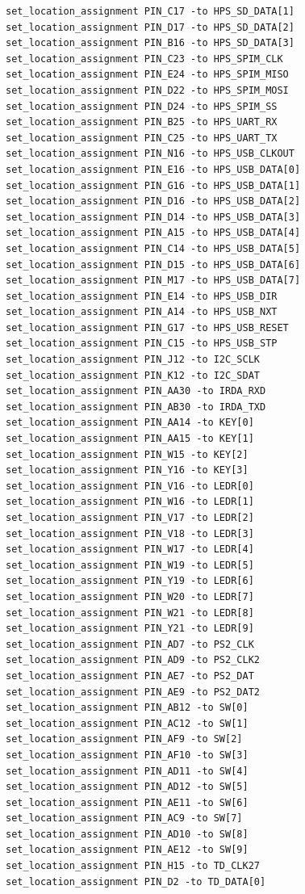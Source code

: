 \documentclass[conference]{IEEEtran}
\begin{document}
\begin{lstlisting}
set_location_assignment PIN_C17 -to HPS_SD_DATA[1]
set_location_assignment PIN_D17 -to HPS_SD_DATA[2]
set_location_assignment PIN_B16 -to HPS_SD_DATA[3]
set_location_assignment PIN_C23 -to HPS_SPIM_CLK
set_location_assignment PIN_E24 -to HPS_SPIM_MISO
set_location_assignment PIN_D22 -to HPS_SPIM_MOSI
set_location_assignment PIN_D24 -to HPS_SPIM_SS
set_location_assignment PIN_B25 -to HPS_UART_RX
set_location_assignment PIN_C25 -to HPS_UART_TX
set_location_assignment PIN_N16 -to HPS_USB_CLKOUT
set_location_assignment PIN_E16 -to HPS_USB_DATA[0]
set_location_assignment PIN_G16 -to HPS_USB_DATA[1]
set_location_assignment PIN_D16 -to HPS_USB_DATA[2]
set_location_assignment PIN_D14 -to HPS_USB_DATA[3]
set_location_assignment PIN_A15 -to HPS_USB_DATA[4]
set_location_assignment PIN_C14 -to HPS_USB_DATA[5]
set_location_assignment PIN_D15 -to HPS_USB_DATA[6]
set_location_assignment PIN_M17 -to HPS_USB_DATA[7]
set_location_assignment PIN_E14 -to HPS_USB_DIR
set_location_assignment PIN_A14 -to HPS_USB_NXT
set_location_assignment PIN_G17 -to HPS_USB_RESET
set_location_assignment PIN_C15 -to HPS_USB_STP
set_location_assignment PIN_J12 -to I2C_SCLK
set_location_assignment PIN_K12 -to I2C_SDAT
set_location_assignment PIN_AA30 -to IRDA_RXD
set_location_assignment PIN_AB30 -to IRDA_TXD
set_location_assignment PIN_AA14 -to KEY[0]
set_location_assignment PIN_AA15 -to KEY[1]
set_location_assignment PIN_W15 -to KEY[2]
set_location_assignment PIN_Y16 -to KEY[3]
set_location_assignment PIN_V16 -to LEDR[0]
set_location_assignment PIN_W16 -to LEDR[1]
set_location_assignment PIN_V17 -to LEDR[2]
set_location_assignment PIN_V18 -to LEDR[3]
set_location_assignment PIN_W17 -to LEDR[4]
set_location_assignment PIN_W19 -to LEDR[5]
set_location_assignment PIN_Y19 -to LEDR[6]
set_location_assignment PIN_W20 -to LEDR[7]
set_location_assignment PIN_W21 -to LEDR[8]
set_location_assignment PIN_Y21 -to LEDR[9]
set_location_assignment PIN_AD7 -to PS2_CLK
set_location_assignment PIN_AD9 -to PS2_CLK2
set_location_assignment PIN_AE7 -to PS2_DAT
set_location_assignment PIN_AE9 -to PS2_DAT2
set_location_assignment PIN_AB12 -to SW[0]
set_location_assignment PIN_AC12 -to SW[1]
set_location_assignment PIN_AF9 -to SW[2]
set_location_assignment PIN_AF10 -to SW[3]
set_location_assignment PIN_AD11 -to SW[4]
set_location_assignment PIN_AD12 -to SW[5]
set_location_assignment PIN_AE11 -to SW[6]
set_location_assignment PIN_AC9 -to SW[7]
set_location_assignment PIN_AD10 -to SW[8]
set_location_assignment PIN_AE12 -to SW[9]
set_location_assignment PIN_H15 -to TD_CLK27
set_location_assignment PIN_D2 -to TD_DATA[0]

\end{lstlisting}
\end{document}
